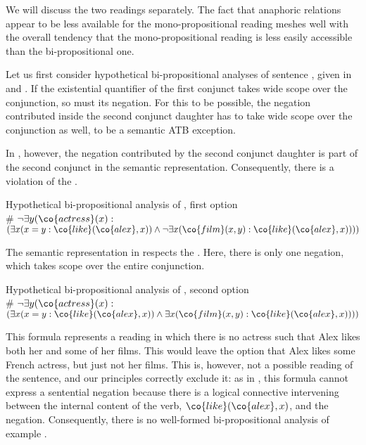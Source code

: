 \documentclass[output=paper]{langsci/langscibook}
\begin{document}
We will discuss the two readings separately. 
The fact that anaphoric relations appear to be less available for the mono-propositional reading meshes well with the overall tendency that the mono-propositional reading is less easily accessible than the bi-propositional one.

Let us first consider hypothetical bi-propositional analyses of sentence , given in  and . 
If the existential quantifier of the first conjunct takes wide scope over the conjunction, so must its negation. 
For this to be possible, the negation contributed inside the second conjunct daughter has to take wide scope over the conjunction as well, to be a semantic ATB exception.

In , however, the negation contributed by the second conjunct daughter is part of the second conjunct in the semantic representation. 
Consequently, there is a violation of the \CCB.

\ea 
Hypothetical bi-propositional analysis of , first option\label{bi-no-ana2}\\[1ex]
\# $\lnot \exists y (\co{actress}(x) : $\\
\hspace*{\fill} $(\exists x (x=y : \co{like}(\co{alex},x)) \land
\lnot \exists x (\co{film}(x,y) : \co{like}(\co{alex},x))))$
\z 

The semantic representation in  respects the \CCB. Here, there is only one negation, which takes scope over the entire conjunction. 

\ea Hypothetical bi-propositional analysis of , second option\label{bi-no-ana}\\[1ex]
\# $\lnot \exists y (\co{actress}(x) : $\\
\hspace*{\fill} $(\exists x (x=y : \co{like}(\co{alex},x)) \land
\exists x (\co{film}(x,y) : \co{like}(\co{alex},x))))$
\z 


This formula represents a reading in which there is no actress such that Alex likes both her and some of her films. 
This would leave the option that Alex likes some French actress, but just not her films. 
This is, however, not a possible reading of the sentence, and our principles correctly exclude it: 
as in , this formula cannot express a sentential negation because there is a logical connective intervening between the internal content of the verb, $\co{like}(\co{alex},x)$, and the negation.
Consequently, there is no well-formed bi-propositional analysis of example .
\end{document}
